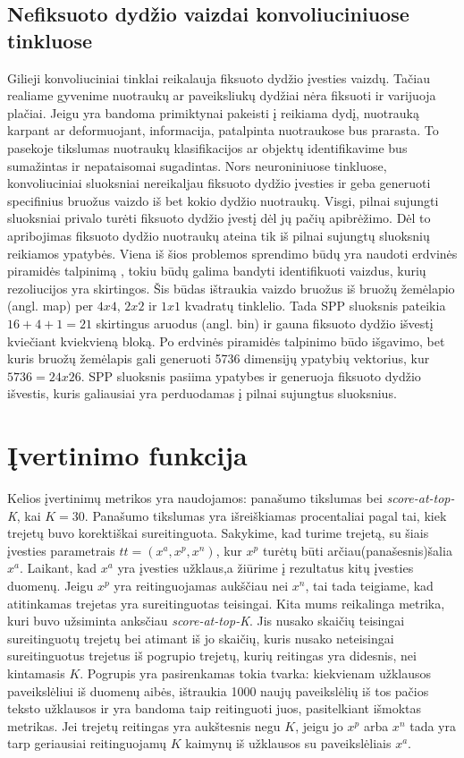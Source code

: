 \documentclass{VUMIFPSkursinis}
\begin{document}
\subsection{Nefiksuoto dydžio vaizdai konvoliuciniuose tinkluose}
Gilieji konvoliuciniai tinklai reikalauja fiksuoto dydžio įvesties vaizdų. Tačiau realiame gyvenime nuotraukų ar paveiksliukų dydžiai nėra fiksuoti ir varijuoja plačiai.
\newline
Jeigu yra bandoma primiktynai pakeisti į reikiama dydį, nuotrauką karpant ar deformuojant, informacija, patalpinta nuotraukose bus prarasta. To pasekoje tikslumas nuotraukų klasifikacijos ar objektų identifikavime bus sumažintas ir nepataisomai sugadintas. Nors neuroniniuose tinkluose, konvoliuciniai sluoksniai nereikaljau fiksuoto dydžio įvesties ir geba generuoti specifinius bruožus vaizdo iš bet kokio dydžio nuotraukų. Visgi, pilnai sujungti sluoksniai privalo turėti fiksuoto dydžio įvestį dėl jų pačių apibrėžimo. Dėl to apribojimas fiksuoto dydžio nuotraukų ateina tik iš pilnai sujungtų sluoksnių reikiamos ypatybės.
Viena iš šios problemos sprendimo būdų yra naudoti erdvinės piramidės talpinimą \cite{Spatial_pyramid_pooling}, tokiu būdų galima bandyti identifikuoti vaizdus, kurių rezoliucijos yra skirtingos.
\newline
Šis būdas ištraukia vaizdo bruožus iš bruožų žemėlapio (angl. map) per $4 x 4$, $2 x 2$ ir $1 x 1$ kvadratų tinklelio. Tada SPP sluoksnis pateikia $16 + 4 + 1 = 21$ skirtingus aruodus (angl. bin) ir gauna fiksuoto dydžio išvestį kviečiant kviekvieną bloką. Po erdvinės piramidės talpinimo būdo išgavimo, bet kuris bruožų žemėlapis gali generuoti 5736 dimensijų ypatybių vektorius, kur $5736 = 24 x 26$. SPP sluoksnis pasiima ypatybes ir generuoja  fiksuoto dydžio išvestis, kuris galiausiai yra perduodamas į pilnai sujungtus sluoksnius.
\pagebreak

\section{Įvertinimo funkcija}
Kelios įvertinimų metrikos yra naudojamos: panašumo tikslumas bei \emph{score-at-top-K}, kai $K = 30$. Panašumo tikslumas yra išreiškiamas procentaliai pagal tai, kiek trejetų buvo korektiškai sureitinguota. Sakykime, kad turime trejetą, su šiais įvesties parametrais $tt = (x^a, x^p, x^n)$, kur $x^p$ turėtų būti arčiau(panašesnis)šalia $x^a$. Laikant, kad $x^a$ yra įvesties užklaus,a žiūrime į rezultatus kitų įvesties duomenų. Jeigu $x^p$ yra reitinguojamas aukščiau nei $x^n$, tai tada teigiame, kad atitinkamas trejetas yra sureitinguotas teisingai. Kita mums reikalinga metrika, kuri buvo užsiminta anksčiau \emph{score-at-top-K}. Jis nusako skaičių teisingai sureitinguotų trejetų bei atimant iš jo skaičių, kuris nusako neteisingai sureitinguotus trejetus iš pogrupio trejetų, kurių reitingas yra didesnis, nei kintamasis $K$. Pogrupis yra pasirenkamas tokia tvarka: kiekvienam užklausos paveikslėliui iš duomenų aibės, ištraukia 1000 naujų paveikslėlių iš tos pačios teksto užklausos ir yra bandoma taip reitinguoti juos, pasitelkiant išmoktas metrikas. Jei trejetų reitingas yra aukštesnis negu $K$, jeigu jo $x^p$ arba $x^n$ tada yra tarp geriausiai reitinguojamų $K$ kaimynų iš užklausos su paveikslėliais $x^a$.
\pagebreak
\end{document}
